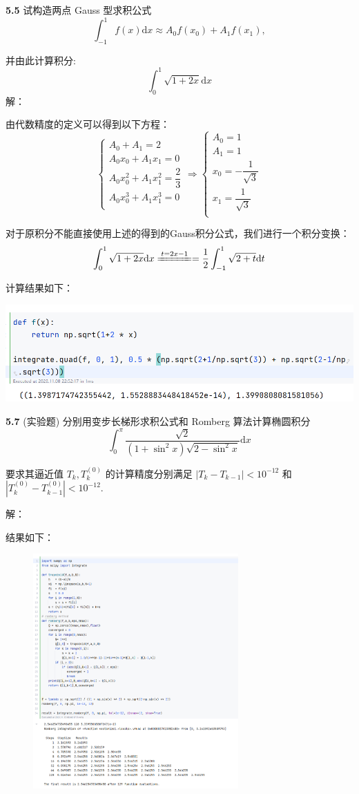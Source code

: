 \documentclass[a4paper,11pt,UTF8]{bitbook}
\begin{document}
\textbf{5.5} 试构造两点 Gauss 型求积公式
$$
	\int_{-1}^1f(x)\mathrm{d}x\approx A_0f(x_0)+A_1f(x_1),
$$

并由此计算积分:
$$
	\int_0^1\sqrt{1+2x}\mathrm{d}x
$$
\noindent 解：

由代数精度的定义可以得到以下方程：
$$
\begin{cases}
	A_0+A_1=2\\
	A_0x_0+A_1x_1=0\\
	A_0x_0^2+A_1x_1^2=\dfrac{2}{3}\\
	A_0x_0^3+A_1x_1^3=0\\
\end{cases}\Rightarrow
\begin{cases}
	A_0=1\\
	A_1=1\\
	x_0=-\dfrac{1}{\sqrt{3}}\\
	x_1=\dfrac{1}{\sqrt{3}}\\
\end{cases}
$$

对于原积分不能直接使用上述的得到的Gauss积分公式，我们进行一个积分变换：
$$
	\int_0^1\sqrt{1+2x}\mathrm{d}x\xlongequal{t=2x-1}=\frac12\int_{-1}^1\sqrt{2+t}\mathrm{d}t
$$

计算结果如下：

\includegraphics[width=1\textwidth]{5.5_1}

\textbf{5.7} (实验题) 分别用变步长梯形求积公式和 Romberg 算法计算椭圆积分
$$
	\int_0^\pi\frac{\sqrt{2}}{(1+\sin^2x)\sqrt{2-\sin^2x}}\mathrm{d}x
$$

要求其逼近值 $T_k,T_k^{(0)}$ 的计算精度分别满足 $|T_k-T_{k-1}|<10^{-12}$ 和$|T_k^{(0)}-T_{k-1}^{(0)}|<10^{-12}$.

\noindent 解：

结果如下：
\begin{figure}[H]
	\centering
	\includegraphics[width=0.7\textwidth]{5.7}
\end{figure}
\end{document}
